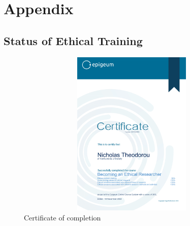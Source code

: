 \chapter{Appendix}

\section{Status of Ethical Training}

\begin{figure} [!h]
	\centering
	\includegraphics[width=14cm,height=8cm,keepaspectratio]{figures/introduction/ethics.png}
	\setlength\belowcaptionskip{3pt}
	\caption{Certificate of completion}
	\label{some-figure}
\end{figure}




